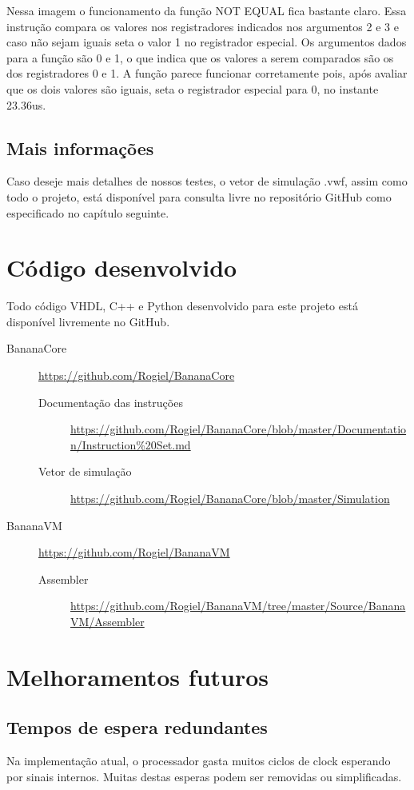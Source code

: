 \documentclass[11pt]{report}
\begin{document}
Nessa imagem o funcionamento da função NOT EQUAL fica bastante claro. Essa instrução compara os valores nos registradores indicados nos argumentos 2 e 3 e caso não sejam iguais seta o valor 1 no registrador especial.
Os argumentos dados para a função são 0 e 1, o que indica que os valores a serem comparados são os dos registradores 0 e 1. A função parece funcionar corretamente pois, após avaliar que os dois valores são iguais, seta o registrador especial para 0, no instante 23.36us.
\section*{Mais informações}
Caso deseje mais detalhes de nossos testes, o vetor de simulação .vwf, assim como todo o projeto, está disponível para consulta livre no repositório GitHub como especificado no capítulo seguinte.


\chapter{Código desenvolvido}
\label{ch:Instruction documentation}
Todo código VHDL, C++ e Python desenvolvido para este projeto está disponível livremente no GitHub.

\begin{description}
	\item[BananaCore] \url{https://github.com/Rogiel/BananaCore}
	\begin{description}
		\item[Documentação das instruções] \url{https://github.com/Rogiel/BananaCore/blob/master/Documentation/Instruction%20Set.md}
		\item[Vetor de simulação] \url{https://github.com/Rogiel/BananaCore/blob/master/Simulation}
	\end{description}
	
	\item[BananaVM] \url{https://github.com/Rogiel/BananaVM}
	\begin{description}
		\item[Assembler] \url{https://github.com/Rogiel/BananaVM/tree/master/Source/BananaVM/Assembler}
	\end{description}
\end{description}

\chapter{Melhoramentos futuros}
\section*{Tempos de espera redundantes}
Na implementação atual, o processador gasta muitos ciclos de clock esperando por sinais internos. Muitas destas esperas podem ser removidas ou simplificadas.
\end{document}
